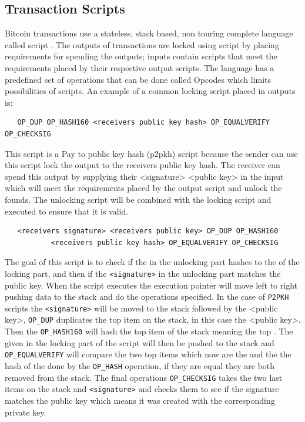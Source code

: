 \subsection{Transaction Scripts}
\label{subsec:scripts}

Bitcoin transactions use a stateless, stack based, non touring complete language called script \cite{antonopoulos2017mastering}.
The outputs of transactions are locked using script by placing requirements for spending the outputs; inputs contain scripts that meet the requirements placed by their respective output scripts. The language has a predefined set of operations that can be done called Opcodes which limits possibilities of scripts. 
An example of a common locking script placed in outputs is: 

\begin{verbatim}
   OP_DUP OP_HASH160 <receivers public key hash> OP_EQUALVERIFY OP_CHECKSIG
\end{verbatim}


This script is a Pay to public key hash (p2pkh) script because the sender can use this script lock the output to the receivers public key hash. The receiver can spend this output by supplying their <signature> <public key> in the input which will meet the requirements placed by the output script and unlock the founds. The unlocking script will be combined with the locking script and executed to ensure that it is valid. 

\begin{verbatim}
   <receivers signature> <receivers public key> OP_DUP OP_HASH160 
           <receivers public key hash> OP_EQUALVERIFY OP_CHECKSIG
\end{verbatim}

The goal of this script is to check if the {\tt <public key>} in the unlocking part hashes to the {\tt  <public key hash>} of the locking part, and then if the {\tt <signature>} in the unlocking part matches the public key.
When the script executes the execution pointer will move left to right pushing data to the stack and do the operations specified.
In the case of {\tt P2PKH} scripts the {\tt <signature>} will be moved to the stack followed by the <public key>, {\tt OP\_DUP} duplicates the top item on the stack, in this case the <public key>. Then the {\tt OP\_HASH160} will hash the top item of the stack meaning the top {\tt <public key>}. The {\tt <public key hash>} given in the locking part of the script will then be pushed to the stack and {\tt OP\_EQUALVERIFY} will compare the two top items which now are the {\tt <public key hash>} and the the hash of the {\tt <public key>} done by the {\tt OP\_HASH} operation, if they are equal they are both removed from the stack. The final operations {\tt OP\_CHECKSIG} takes the two last items on the stack {\tt <public key>} and {\tt <signature>} and checks them to see if the signature matches the public key which means it was created with the corresponding private key.


